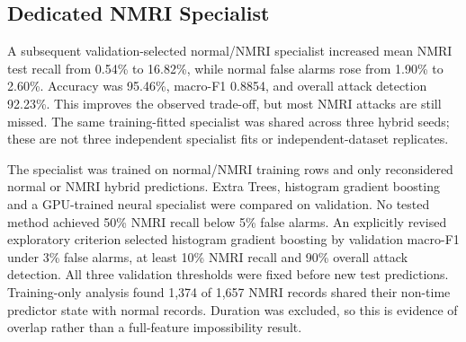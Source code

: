 \subsection{Dedicated NMRI Specialist}
A subsequent validation-selected normal/NMRI specialist increased mean NMRI test recall from 0.54\% to 16.82\%, while normal false alarms rose from 1.90\% to 2.60\%. Accuracy was 95.46\%, macro-F1 0.8854, and overall attack detection 92.23\%. This improves the observed trade-off, but most NMRI attacks are still missed. The same training-fitted specialist was shared across three hybrid seeds; these are not three independent specialist fits or independent-dataset replicates.

The specialist was trained on normal/NMRI training rows and only reconsidered normal or NMRI hybrid predictions. Extra Trees, histogram gradient boosting and a GPU-trained neural specialist were compared on validation. No tested method achieved 50\% NMRI recall below 5\% false alarms. An explicitly revised exploratory criterion selected histogram gradient boosting by validation macro-F1 under 3\% false alarms, at least 10\% NMRI recall and 90\% overall attack detection. All three validation thresholds were fixed before new test predictions. Training-only analysis found 1,374 of 1,657 NMRI records shared their non-time predictor state with normal records. Duration was excluded, so this is evidence of overlap rather than a full-feature impossibility result.

\begin{table}[htbp]\centering\small\setlength{\tabcolsep}{3pt}

\caption{Observed test operating points. NMRI denotes class recall, and FPR is the normal false-positive rate. Means use three hybrid seeds; the specialist is shared.}
\end{table}
